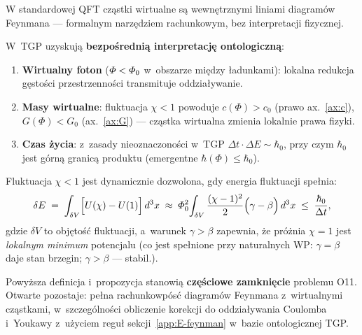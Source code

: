 \begin{remark}
\label{rem:virtual-comparison}
W standardowej QFT cz\k{a}stki wirtualne s\k{a} wewn\k{e}trznymi
liniami diagram\'ow Feynmana --- formalnym narz\k{e}dziem
rachunkowym, bez interpretacji fizycznej.

W~TGP uzyskuj\k{a} \textbf{bezpo\'sredni\k{a} interpretacj\k{e} ontologiczn\k{a}}:
\begin{enumerate}[nosep]
    \item \textbf{Wirtualny foton} ($\varPhi < \varPhi_0$ w~obszarze
          mi\k{e}dzy \l{}adunkami): lokalna redukcja g\k{e}sto\'sci
          przestrzenno\'sci transmituje oddzia\l{}ywanie.
    \item \textbf{Masy wirtualne}: fluktuacja $\chi < 1$ powoduje
          $c(\Phi) > c_0$ (prawo ax.~\ref{ax:c}),
          $G(\Phi) < G_0$ (ax.~\ref{ax:G}) ---
          cz\k{a}stka wirtualna zmienia lokalnie prawa fizyki.
    \item \textbf{Czas \.zycia}: z~zasady nieoznaczono\'sci w~TGP
          $\Delta t \cdot \Delta E \sim \hbar_0$,
          przy czym $\hbar_0$ jest g\'orn\k{a} granic\k{a} produktu
          (emergentne $\hbar(\Phi) \leq \hbar_0$).
\end{enumerate}
\end{remark}

\begin{proposition}\label{prop:virtual-existence}
Fluktuacja $\chi < 1$ jest dynamicznie dozwolona,
gdy energia fluktuacji spe\l{}nia:
\begin{equation}\label{eq:virtual-energy}
    \delta E \;=\; \int_{\delta V}
    \Bigl[U(\chi) - U(1)\Bigr]\,d^3x
    \;\approx\; \varPhi_0^2\!\int_{\delta V}
    \frac{(\chi-1)^2}{2}\Bigl(\gamma - \beta\Bigr)\,d^3x
    \;\leq\; \frac{\hbar_0}{\Delta t},
\end{equation}
gdzie $\delta V$ to obj\k{e}to\'s\'c fluktuacji,
a~warunek $\gamma > \beta$ zapewnia,
\.ze pr\'o\.znia $\chi=1$ jest \emph{lokalnym minimum} potencjalu
(co jest spe\l{}nione przy naturalnych WP:
$\gamma = \beta$ daje stan brzegin; $\gamma > \beta$ --- stabil.).
\end{proposition}

\begin{remark}[Status O11]
Powy\.zsza definicja i~propozycja stanowi\k{a} \textbf{cz\k{e}\'sciowe zamkni\k{e}cie}
problemu O11.
Otwarte pozostaje: pe\l{}na rachunkowp\'os\'c diagram\'ow Feynmana
z~wirtualnymi cz\k{a}stkami, w~szczeg\'olno\'sci obliczenie
korekcji do oddzia\l{}ywania Coulomba i~Youkawy z~u\.zyciem
regu\l{} sekcji~\ref{app:E-feynman}
w~bazie ontologicznej TGP.
\end{remark}

